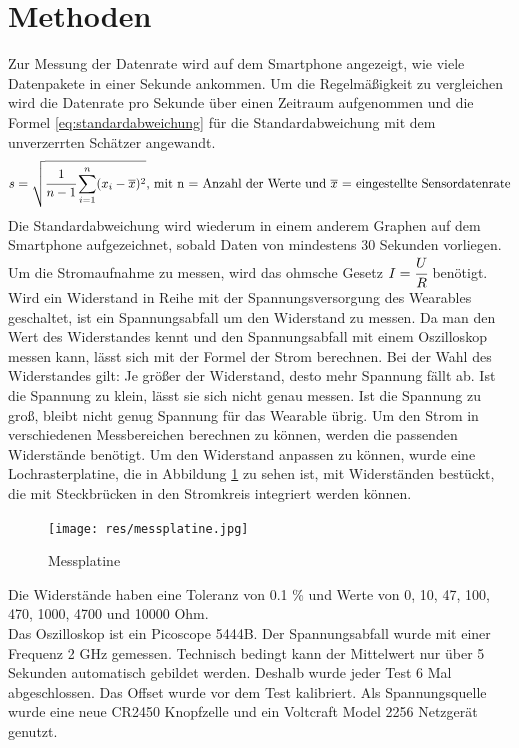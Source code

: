 \section{Methoden}
Zur Messung der Datenrate wird auf dem Smartphone angezeigt, wie viele Datenpakete in einer Sekunde ankommen.
Um die Regelmäßigkeit zu vergleichen wird die Datenrate pro Sekunde über einen Zeitraum aufgenommen und die Formel \ref{eq:standardabweichung} für die Standardabweichung mit dem unverzerrten Schätzer angewandt.
\begin{equation}
  \label{eq:standardabweichung}
	s = \sqrt{\cfrac{1}{n-1}\sum_{i=1}^{n} (x_{i}-\overline{x})^{2}}\text{, mit n = Anzahl der Werte und $\overline{x}$ = eingestellte Sensordatenrate}
\end{equation}
Die Standardabweichung wird wiederum in einem anderem Graphen auf dem Smartphone aufgezeichnet, sobald Daten von mindestens 30 Sekunden vorliegen.\\
Um die Stromaufnahme zu messen, wird das ohmsche Gesetz $I = \cfrac{U}{R}$ benötigt.
Wird ein Widerstand in Reihe mit der Spannungsversorgung des Wearables geschaltet, ist ein Spannungsabfall um den Widerstand zu messen.
Da man den Wert des Widerstandes kennt und den Spannungsabfall mit einem Oszilloskop messen kann, lässt sich mit der Formel der Strom berechnen.
Bei der Wahl des Widerstandes gilt: Je größer der Widerstand, desto mehr Spannung fällt ab.
Ist die Spannung zu klein, lässt sie sich nicht genau messen.
Ist die Spannung zu groß, bleibt nicht genug Spannung für das Wearable übrig.
Um den Strom in verschiedenen Messbereichen berechnen zu können, werden die passenden Widerstände benötigt.
Um den Widerstand anpassen zu können, wurde eine Lochrasterplatine, die in Abbildung \ref{fig:messplatine} zu sehen ist, mit Widerständen bestückt, die mit Steckbrücken in den Stromkreis integriert werden können.
\begin{figure}[hbtp]
	\centering
	\texttt{[image: res/messplatine.jpg]}
	\caption{Messplatine}
	\label{fig:messplatine}
\end{figure}
Die Widerstände haben eine Toleranz von 0.1 \% und Werte von 0, 10, 47, 100, 470, 1000, 4700 und 10000 Ohm.\\
Das Oszilloskop ist ein Picoscope 5444B.
Der Spannungsabfall wurde mit einer Frequenz 2 GHz gemessen.
Technisch bedingt kann der Mittelwert nur über 5 Sekunden automatisch gebildet werden.
Deshalb wurde jeder Test 6 Mal abgeschlossen.
Das Offset wurde vor dem Test kalibriert.
Als Spannungsquelle wurde eine neue CR2450 Knopfzelle und ein Voltcraft Model 2256 Netzgerät genutzt.
